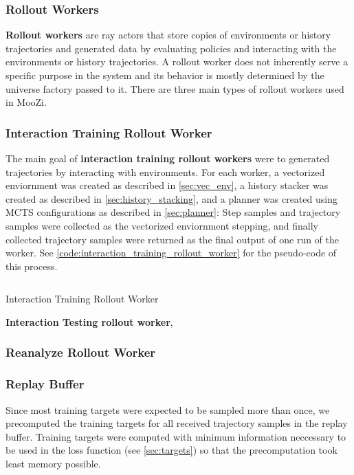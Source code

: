 \documentclass[12pt]{article}
\newcommand{\includecode}[2]{
\begin{listing}[H]
    \inputminted[frame=single, framesep=10pt, fontsize=\footnotesize]{python}{src/#1.py}
    \caption[]{#2}
    \label{code:#1}
\end{listing}   
}
\begin{document}
\subsubsection{Rollout Workers}
\textbf{Rollout workers} are ray actors that store copies of environments or history trajectories and generated data by evaluating policies and interacting with the environments or history trajectories.
A rollout worker does not inherently serve a specific purpose in the system and its behavior is mostly determined by the universe factory passed to it.
There are three main types of rollout workers used in MooZi.

\subsubsection{Interaction Training Rollout Worker} \label{sec:train_rw}
The main goal of \textbf{interaction training rollout workers} were to generated trajectories by interacting with environments.
For each worker, a vectorized enviornment was created as described in \ref{sec:vec_env}, a history stacker was created as described in \ref{sec:history_stacking}, and a planner was created using MCTS configurations as described in \ref{sec:planner}:
Step samples and trajectory samples were collected as the vectorized enviornment stepping, and finally collected trajectory samples were returned as the final output of one run of the worker.
See \ref{code:interaction_training_rollout_worker} for the pseudo-code of this process.

\includecode{interaction_training_rollout_worker}{Interaction Training Rollout Worker}

\textbf{Interaction Testing rollout worker},

\subsubsection{Reanalyze Rollout Worker} \label{sec:reanalyze_rw}

\subsubsection{Replay Buffer} \label{sec:replay}

Since most training targets were expected to be sampled more than once, we precomputed the training targets for all received trajectory samples in the replay buffer.
Training targets were computed with minimum information neccessary to be used in the loss function (see \ref{sec:targets}) so that the precomputation took least memory possible.
\end{document}
